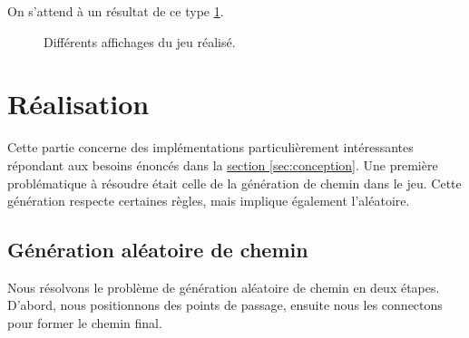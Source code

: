 \documentclass{article}
\begin{document}
On s'attend à un résultat de ce type \ref{fig:affichages}.

\begin{figure}[H]
    \centering
    \qquad
    \caption{Différents affichages du jeu réalisé.}%
    \label{fig:affichages}%
     \vspace*{-0.3cm}
\end{figure}

\section{Réalisation}

Cette partie concerne des implémentations particulièrement intéressantes répondant aux besoins énoncés dans la \hyperref[sec:conception]{section \ref{sec:conception}}. Une première problématique à résoudre était celle de la génération de chemin dans le jeu. Cette génération respecte certaines règles, mais implique également l'aléatoire.

\subsection{Génération aléatoire de chemin}
Nous résolvons le problème de génération aléatoire de chemin en deux étapes. D'abord, nous positionnons des points de passage, ensuite nous les connectons pour former le chemin final.
\end{document}
